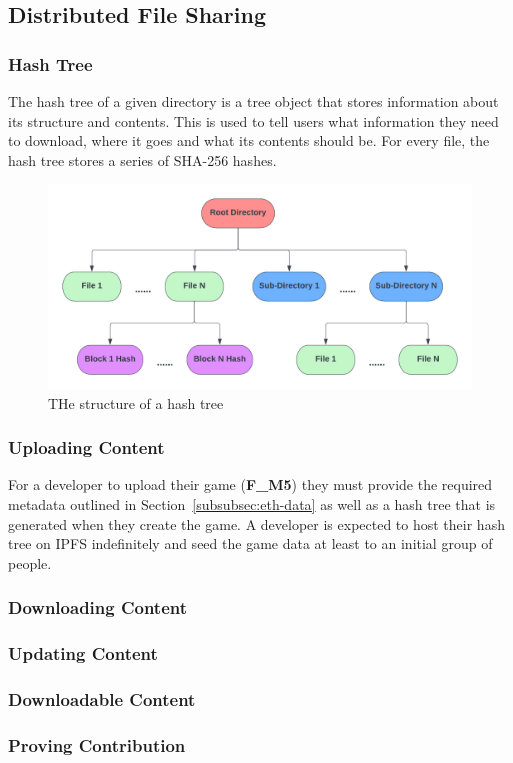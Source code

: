 
\subsection{Distributed File Sharing}

\subsubsection*{Hash Tree}

The hash tree of a given directory is a tree object that stores information about its structure and contents. This is used to tell users what information they need to download, where it goes and what its contents should be. For every file, the hash tree stores a series of SHA-256 hashes. 

\begin{figure}[ht]
  \centering
  \includegraphics[width=.85\textwidth]{assets/images/diagrams/block-body.png}
  \caption{THe structure of a hash tree}
  \label{fig:hash-storage}
\end{figure}

\subsubsection*{Uploading Content}

For a developer to upload their game (\textbf{F\_M5}) they must provide the required metadata outlined in Section~\ref{subsubsec:eth-data} as well as a hash tree that is generated when they create the game.
\x
A developer is expected to host their hash tree on IPFS indefinitely and seed the game data at least to an initial group of people. 

\subsubsection*{Downloading Content}

\subsubsection*{Updating Content}

\subsubsection*{Downloadable Content}

\subsubsection*{Proving Contribution}